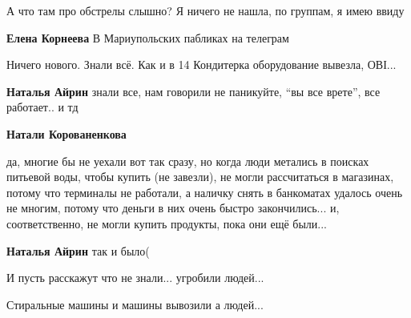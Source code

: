  
 
 
 
 

\qqSecCmt


А что там про обстрелы слышно? Я ничего не нашла, по группам, я имею ввиду

\begin{itemize} %
\textbf{Елена Корнеева} В Мариупольских пабликах на телеграм
\end{itemize} %


Ничего нового. Знали всё. Как и в 14 Кондитерка оборудование вывезла, ОВІ...

\begin{itemize} %
\textbf{Наталья Айрин} знали все, нам говорили не паникуйте, \enquote{вы все врете}, все работает.. и тд

\textbf{Натали Корованенкова} 

да, многие бы не уехали вот так сразу, но когда люди метались в поисках
питьевой воды, чтобы купить (не завезли), не могли рассчитаться в магазинах,
потому что терминалы не работали, а наличку снять в банкоматах удалось очень не
многим, потому что деньги в них очень быстро закончились... и, соответственно,
не могли купить продукты, пока они ещё были...

\textbf{Наталья Айрин} так и было(
\end{itemize} %


И пусть расскажут что не знали... угробили людей...

Стиральные машины и машины вывозили а людей...
